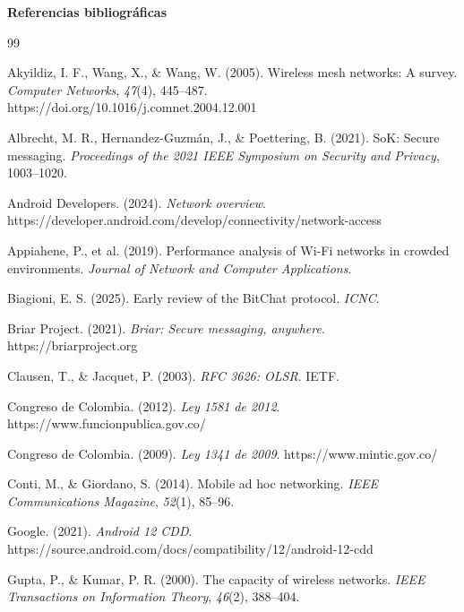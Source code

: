 \documentclass[12pt,letterpaper]{article}
\newcommand{\capitulo}[1]{%
  \par\vspace{0.5\baselineskip}%
  \noindent\textbf{#1}\par
  \vspace{0.35\baselineskip}%
}
\begin{document}
\setcounter{page}{1}





\newpage
\capitulo{Referencias bibliográficas}

\begin{thebibliography}{99}

Akyildiz, I. F., Wang, X., \& Wang, W. (2005). Wireless mesh networks: A survey. \textit{Computer Networks}, \textit{47}(4), 445--487. https://doi.org/10.1016/j.comnet.2004.12.001

Albrecht, M. R., Hernandez-Guzmán, J., \& Poettering, B. (2021). SoK: Secure messaging. \textit{Proceedings of the 2021 IEEE Symposium on Security and Privacy}, 1003--1020.

Android Developers. (2024). \textit{Network overview}. https://developer.android.com/develop/connectivity/network-access

Appiahene, P., et al. (2019). Performance analysis of Wi-Fi networks in crowded environments. \textit{Journal of Network and Computer Applications}.

Biagioni, E. S. (2025). Early review of the BitChat protocol. \textit{ICNC}.

Briar Project. (2021). \textit{Briar: Secure messaging, anywhere}. https://briarproject.org

Clausen, T., \& Jacquet, P. (2003). \textit{RFC 3626: OLSR}. IETF.

Congreso de Colombia. (2012). \textit{Ley 1581 de 2012}. https://www.funcionpublica.gov.co/

Congreso de Colombia. (2009). \textit{Ley 1341 de 2009}. https://www.mintic.gov.co/

Conti, M., \& Giordano, S. (2014). Mobile ad hoc networking. \textit{IEEE Communications Magazine}, \textit{52}(1), 85--96.

Google. (2021). \textit{Android 12 CDD}. https://source.android.com/docs/compatibility/12/android-12-cdd

Gupta, P., \& Kumar, P. R. (2000). The capacity of wireless networks. \textit{IEEE Transactions on Information Theory}, \textit{46}(2), 388--404.


\end{thebibliography}
\end{document}
